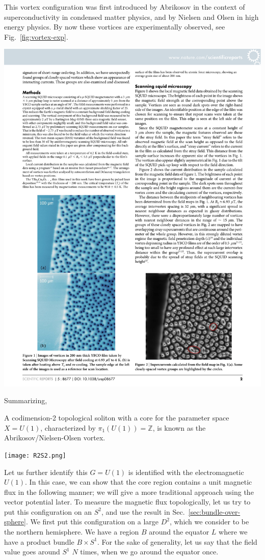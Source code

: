 \documentclass[12pt]{article}
\numberwithin{equation}{section}
\renewenvironment{figure}[1][]{
  \begin{originalfigure}[#1]
    \begin{mdframed}[linecolor=black!0,backgroundcolor=black!1]
}{
    \end{mdframed}
  \end{originalfigure}
}
\def\bZ{\mathbb{Z}}
\begin{document}
This vortex configuration was first introduced by Abrikosov \cite{Abrikosov:1956sx} in the context of superconductivity 
in condensed matter physics,
and by Nielsen and Olsen \cite{Nielsen:1973cs} in high energy physics. 
By now these vortices are experimentally observed, see Fig.~\ref{fig:vortex-exp}.
\begin{figure}[h]
\centering
\includegraphics[width=.5\textwidth]{vortices.pdf}
\caption{A scanning SQUID-microscope view of the vortices in a superconducting material.
Taken from \cite{VortexExp}.}
\label{fig:vortex-exp}
\end{figure}
Summarizing, 
\begin{example}
A codimension-2 topological soliton with a core for the parameter space $X=U(1)$,
characterized by $\pi_1(U(1))=\bZ$,
is known as the Abrikosov/Nielsen-Olsen vortex.
\end{example}

\begin{figure}[h]
\centering
\texttt{[image: R2S2.png]}
\caption{Putting a vortex configuration on $S^2$.}
\label{fig:R2S2}
\end{figure}
\fi

Let us further identify this $G=U(1)$ is identified with the electromagnetic $U(1)$.
In this case, we can show that the core region contains a unit magnetic flux in the following manner;
we will give a more traditional approach using the vector potential later.
To measure the magnetic flux topologically,
let us try to put this configuration on an $S^2$, and use the result in Sec.~\ref{sec:bundle-over-sphere}.
We first put this configuration on a large $D^2$, which we consider to be the northern hemisphere.
We have a region $B$ around the equator $L$ 
where we have a product bundle $B \times S^1$.
For the sake of generality,
let us say that the field value  goes around $S^1$ $N$ times, when we go around the equator once.
\end{document}
